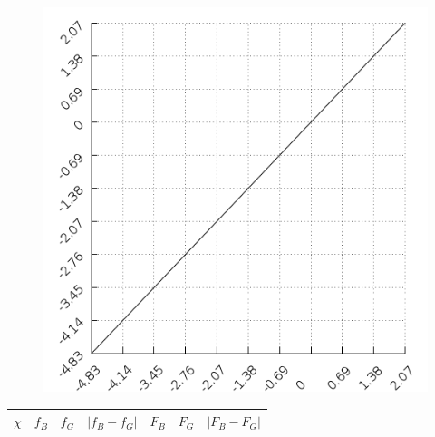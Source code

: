 \documentclass[a4paper,12pt]{article}
\begin{document}
\begin{figure}[h!]
\centering
\includegraphics[angle=-45, width = \textwidth]{plot.png}
\end{figure}



\begin{longtable}{|c|c|c|c|c|c|c|}
\hline
$\chi$ & $f_B$ & $f_G$ & $|f_B - f_G|$ & $F_B$ & $F_G$ & $|F_B-F_G|$ \\
\hline

\hline
\end{longtable}
\end{document}
